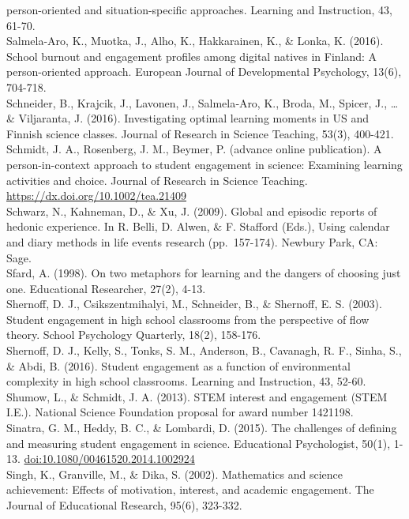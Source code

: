 \documentclass[]{msu-thesis}
\theoremstyle{definition}
\theoremstyle{definition}
\theoremstyle{definition}
\theoremstyle{remark}
\begin{document}
person-oriented and situation-specific approaches. Learning and
Instruction, 43, 61-70.\\
Salmela-Aro, K., Muotka, J., Alho, K., Hakkarainen, K., \& Lonka, K.
(2016). School burnout and engagement profiles among digital natives in
Finland: A person-oriented approach. European Journal of Developmental
Psychology, 13(6), 704-718.\\
Schneider, B., Krajcik, J., Lavonen, J., Salmela‐Aro, K., Broda, M.,
Spicer, J., \ldots{} \& Viljaranta, J. (2016). Investigating optimal
learning moments in US and Finnish science classes. Journal of Research
in Science Teaching, 53(3), 400-421.\\
Schmidt, J. A., Rosenberg, J. M., Beymer, P. (advance online
publication). A person-in-context approach to student engagement in
science: Examining learning activities and choice. Journal of Research
in Science Teaching. \url{https://dx.doi.org/10.1002/tea.21409}\\
Schwarz, N., Kahneman, D., \& Xu, J. (2009). Global and episodic reports
of hedonic experience. In R. Belli, D. Alwen, \& F. Stafford (Eds.),
Using calendar and diary methods in life events research (pp.~157-174).
Newbury Park, CA: Sage.\\
Sfard, A. (1998). On two metaphors for learning and the dangers of
choosing just one. Educational Researcher, 27(2), 4-13.\\
Shernoff, D. J., Csikszentmihalyi, M., Schneider, B., \& Shernoff, E. S.
(2003). Student engagement in high school classrooms from the
perspective of flow theory. School Psychology Quarterly, 18(2),
158-176.\\
Shernoff, D. J., Kelly, S., Tonks, S. M., Anderson, B., Cavanagh, R. F.,
Sinha, S., \& Abdi, B. (2016). Student engagement as a function of
environmental complexity in high school classrooms. Learning and
Instruction, 43, 52-60.\\
Shumow, L., \& Schmidt, J. A. (2013). STEM interest and engagement (STEM
I.E.). National Science Foundation proposal for award number 1421198.\\
Sinatra, G. M., Heddy, B. C., \& Lombardi, D. (2015). The challenges of
defining and measuring student engagement in science. Educational
Psychologist, 50(1), 1-13. \url{doi:10.1080/00461520.2014.1002924}\\
Singh, K., Granville, M., \& Dika, S. (2002). Mathematics and science
achievement: Effects of motivation, interest, and academic engagement.
The Journal of Educational Research, 95(6), 323-332.\\
\end{document}
